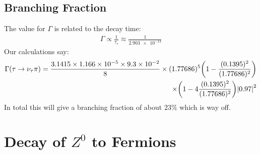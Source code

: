 \documentclass[12pt]{article}
\begin{document}
\subsection{Branching Fraction}
The value for $\Gamma$ is related to the decay time:
\begin{align*}
  \Gamma\propto\frac{1}{\tau_\tau}\approx\frac{1}{\num{2.903e-13}}
\end{align*}
Our calculations say:
\begin{align*}
  \Gamma(\tau\to\nu_\tau\pi)=\frac{3.1415\times\num{1.166e-5}\times\num{9.3e-2}}
  {8}\times(1.77686)^5\qty(1-\frac{(0.1395)^2}{(1.77686)^2})\\
  \times\qty(1-4\frac{(0.1395)^2}{(1.77686)^2})\abs{0.97}^2
\end{align*}
In total this will give a branching fraction of about $23\%$ which is way off. 
\newpage\section{Decay of $Z^0$ to Fermions}
\end{document}
